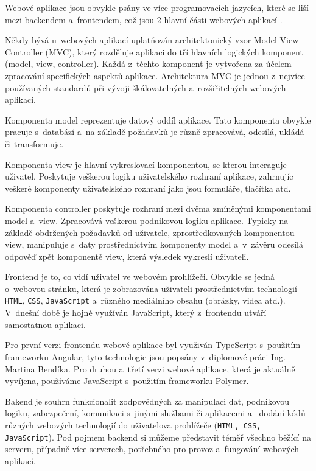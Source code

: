\documentclass[12pt]{article}
\begin{document}
Webové aplikace jsou obvykle psány ve více programovacích jazycích,
které se liší mezi backendem a~frontendem,
což jsou 2 hlavní části webových aplikací \cite{odinuv}.



Někdy bývá u~webových aplikací uplatňován architektonický vzor Model-View-Controller 
(MVC),
který rozděluje aplikaci do tří hlavních logických komponent (model, view, controller).
Každá z~těchto komponent je vytvořena za účelem zpracování specifických aspektů aplikace.
Architektura MVC je jednou z~nejvíce používaných standardů při vývoji
škálovatelných a~rozšiřitelných webových aplikací.

Komponenta model reprezentuje datový oddíl aplikace. 
Tato komponenta obvykle pracuje s~databází a~na základě požadavků 
je různě zpracovává, odesílá, ukládá či transformuje.

Komponenta view je hlavní vykreslovací komponentou, se kterou interaguje uživatel.
Poskytuje veškerou logiku uživatelského rozhraní aplikace, 
zahrnujíc veškeré komponenty uživatelského rozhraní jako jsou formuláře, tlačítka 
atd.

Komponenta controller poskytuje rozhraní mezi dvěma zmíněnými komponentami
model a~view. Zpracovává veškerou podnikovou logiku aplikace. 
Typicky na základě obdržených požadavků od uživatele, zprostředkovaných komponentou
view, manipuluje s~daty prostřednictvím komponenty model a~v~závěru odesílá
odpověď zpět komponentě view, která výsledek vykreslí uživateli.



Frontend je to, co vidí uživatel ve webovém prohlížeči.
Obvykle se jedná o~webovou stránku, která je zobrazována uživateli prostřednictvím
technologií \texttt{HTML}, \texttt{CSS}, \texttt{JavaScript} a~různého mediálního obsahu (obrázky, videa atd.).
V~dnešní době je hojně využíván JavaScript, který z~frontendu utváří samostatnou aplikaci.

Pro první verzi frontendu webové aplikace byl využiván TypeScript
s~použitím frameworku Angular,
tyto technologie jsou popsány v~diplomové práci Ing. Martina Bendíka.
Pro druhou a~třetí verzi webové aplikace, která je aktuálně vyvíjena, 
používáme JavaScript s~použitím frameworku Polymer.


Bakend je souhrn funkcionalit zodpovědných za manipulaci dat, 
podnikovou logiku, zabezpečení, komunikaci s~jinými službami či aplikacemi a~
dodání kódů různých webových technologií do uživatelova prohlížeče (\texttt{HTML, CSS, JavaScript}).
Pod pojmem backend si můžeme představit téměř všechno běžící na serveru, 
případně více serverech, potřebného pro provoz a~fungování webových aplikací.
\end{document}

